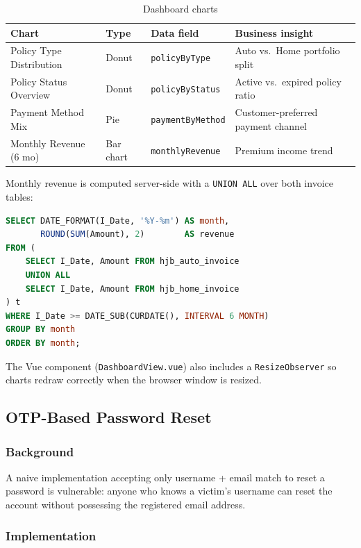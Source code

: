 \documentclass[12pt,letterpaper]{article}
\begin{document}
\begin{table}[H]
\centering\small
\begin{tabular}{lllp{6cm}}
\toprule
\textbf{Chart} & \textbf{Type} & \textbf{Data field} & \textbf{Business insight} \\
\midrule
Policy Type Distribution & Donut     & \texttt{policyByType}    & Auto vs.\ Home portfolio split \\
Policy Status Overview   & Donut     & \texttt{policyByStatus}  & Active vs.\ expired policy ratio \\
Payment Method Mix       & Pie       & \texttt{paymentByMethod} & Customer-preferred payment channel \\
Monthly Revenue (6 mo)   & Bar chart & \texttt{monthlyRevenue}  & Premium income trend \\
\bottomrule
\end{tabular}
\caption{Dashboard charts}
\end{table}

Monthly revenue is computed server-side with a \texttt{UNION ALL} over both invoice tables:

\begin{lstlisting}[language=SQL,caption={Monthly revenue aggregation for the dashboard bar chart}]
SELECT DATE_FORMAT(I_Date, '%Y-%m') AS month,
       ROUND(SUM(Amount), 2)        AS revenue
FROM (
    SELECT I_Date, Amount FROM hjb_auto_invoice
    UNION ALL
    SELECT I_Date, Amount FROM hjb_home_invoice
) t
WHERE I_Date >= DATE_SUB(CURDATE(), INTERVAL 6 MONTH)
GROUP BY month
ORDER BY month;
\end{lstlisting}

The Vue component (\texttt{DashboardView.vue}) also includes a \texttt{ResizeObserver} so charts redraw correctly when the browser window is resized.

\subsection{OTP-Based Password Reset}

\subsubsection*{Background}

A naive implementation accepting only username + email match to reset a password is vulnerable: anyone who knows a victim's username can reset the account without possessing the registered email address.

\subsubsection*{Implementation}
\end{document}
